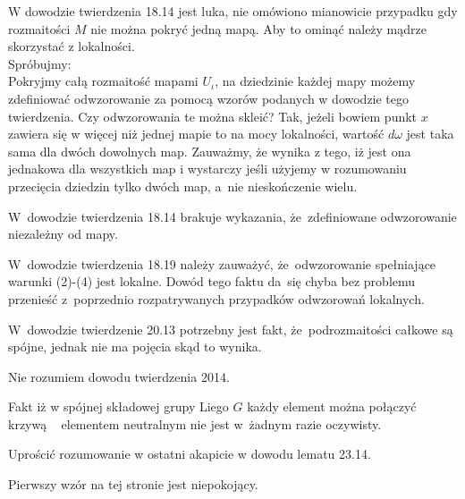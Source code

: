 \documentclass[a4paper,11pt]{article}
\begin{document}
\start {} W dowodzie twierdzenia 18.14 jest luka, nie omówiono mianowicie przypadku gdy rozmaitości $M$ nie można pokryć jedną mapą. Aby to ominąć należy mądrze skorzystać z lokalności. \\Spróbujmy:\\
Pokryjmy całą rozmaitość mapami $U_{ \iota }$, na dziedzinie każdej
mapy możemy zdefiniować odwzorowanie za pomocą wzorów podanych w
dowodzie tego twierdzenia. Czy odwzorowania te można skleić? Tak,
jeżeli bowiem punkt $x$ zawiera się w więcej niż jednej mapie to na
mocy lokalności, wartość $d \omega$ jest taka sama dla dwóch dowolnych
map. Zauważmy, że wynika z tego, iż jest ona jednakowa dla wszystkich
map i wystarczy jeśli użyjemy w rozumowaniu przecięcia dziedzin tylko
dwóch map, a~nie nieskończenie wielu.

\vspace{\spaceFour}


\start {} W~dowodzie twierdzenia 18.14 brakuje wykazania,
że~zdefiniowane odwzorowanie niezależny od mapy.

\vspace{\spaceFour}


\start {} W~dowodzie twierdzenia 18.19 należy zauważyć,
że~odwzorowanie spełniające warunki (2)-(4) jest lokalne. Dowód tego
faktu da~się chyba bez problemu przenieść z~poprzednio rozpatrywanych
przypadków odwzorowań lokalnych.

\vspace{\spaceFour}


\start {} W~dowodzie twierdzenie 20.13 potrzebny jest fakt,
że~podrozmaitości całkowe są spójne, jednak nie ma pojęcia skąd to
wynika.

\vspace{\spaceFour}


\start {} Nie rozumiem dowodu twierdzenia 2014.

\vspace{\spaceFour}


\start {} Fakt iż w spójnej składowej grupy Liego $ G $ każdy
element można połączyć krzywą ~ elementem neutralnym nie jest w~żadnym
razie oczywisty.

\vspace{\spaceFour}


\start {} Uprościć rozumowanie w ostatni akapicie w dowodu
lematu 23.14.

\vspace{\spaceFour}


\start {} Pierwszy wzór na tej stronie jest niepokojący.
\end{document}

